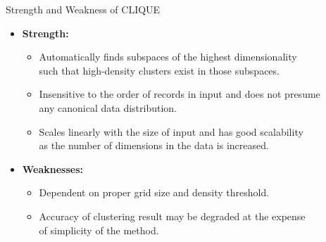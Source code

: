 \begin{frame}{Strength and Weakness of CLIQUE}
	\begin{itemize}
		\item \textbf{Strength:}
		      \begin{itemize}
			      \item Automatically finds subspaces of the highest dimensionality \\
			            such that high-density clusters exist in those subspaces.
			      \item Insensitive to the order of records in input and does not
			            presume \\
			            any canonical data distribution.
			      \item Scales linearly with the size of input and has good
			            scalability \\
			            as the number of dimensions in the data is increased.
		      \end{itemize}
		\item \textbf{Weaknesses:}
		      \begin{itemize}
			      \item Dependent on proper grid size and density threshold.
			      \item Accuracy of clustering result may be degraded at the expense
			            \\
			            of simplicity of the method.
		      \end{itemize}
	\end{itemize}
\end{frame}
